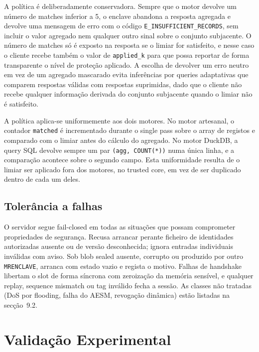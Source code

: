 A política é deliberadamente conservadora. Sempre que o motor devolve um número de matches inferior a 5, o enclave abandona a resposta agregada e devolve uma mensagem de erro com o código \texttt{E\_INSUFFICIENT\_}\texttt{RECORDS}, sem incluir o valor agregado nem qualquer outro sinal sobre o conjunto subjacente. O número de matches só é exposto na resposta se o limiar for satisfeito, e nesse caso o cliente recebe também o valor de \texttt{applied\_k} para que possa reportar de forma transparente o nível de proteção aplicado. A escolha de devolver um erro neutro em vez de um agregado mascarado evita inferências por queries adaptativas que comparem respostas válidas com respostas suprimidas, dado que o cliente não recebe qualquer informação derivada do conjunto subjacente quando o limiar não é satisfeito.

A política aplica-se uniformemente aos dois motores. No motor artesanal, o contador \texttt{matched} é incrementado durante o single pass sobre o array de registos e comparado com o limiar antes do cálculo do agregado. No motor DuckDB, a query SQL devolve sempre um par \texttt{(agg, COUNT(*))} numa única linha, e a comparação acontece sobre o segundo campo. Esta uniformidade resulta de o limiar ser aplicado fora dos motores, no trusted core, em vez de ser duplicado dentro de cada um deles.

\subsection{Tolerância a falhas}

O servidor segue fail-closed em todas as situações que possam comprometer propriedades de segurança. Recusa arrancar perante ficheiro de identidades autorizadas ausente ou de versão desconhecida; ignora entradas individuais inválidas com aviso. Sob blob sealed ausente, corrupto ou produzido por outro \texttt{MRENCLAVE}, arranca com estado vazio e regista o motivo. Falhas de handshake libertam o slot de forma síncrona com zeroização da memória sensível, e qualquer replay, sequence mismatch ou tag inválido fecha a sessão. As classes não tratadas (DoS por flooding, falha do AESM, revogação dinâmica) estão listadas na secção~9.2.

\section{Validação Experimental}

